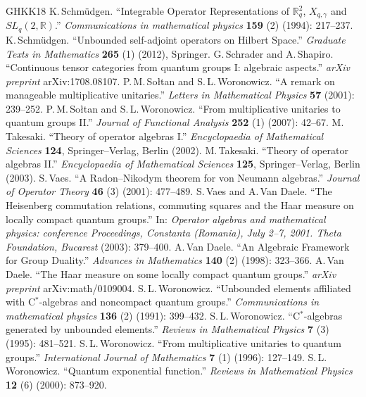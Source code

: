\documentclass[11pt, reqno]{amsart}
\theoremstyle{definition}
\numberwithin{equation}{section}
\def\R{\mathbb R}
\begin{document}
\begin{thebibliography}{GHKK18}
 K.\,Schm\"{u}dgen. ``Integrable Operator Representations of $\R_q^2$, $X_{q,\gamma}$ and $SL_q(2,\R)$.'' \emph{Communications in mathematical physics} \textbf{159} (2) (1994): 217--237.
 K.\,Schm\"{u}dgen. ``Unbounded self-adjoint operators on Hilbert Space.'' \emph{Graduate Texts in Mathematics} \textbf{265} (1) (2012), Springer.
 G.\,Schrader and A.\,Shapiro. ``Continuous tensor categories from quantum groups I: algebraic aspects.'' \emph{arXiv preprint} arXiv:1708.08107.
 P.\,M.\,So\l tan and S.\,L.\,Woronowicz. ``A remark on manageable multiplicative unitaries.'' \emph{Letters in Mathematical Physics} \textbf{57} (2001): 239--252.
 P.\,M.\,So\l tan and S.\,L.\,Woronowicz. ``From multiplicative unitaries to quantum groups II.'' \emph{Journal of Functional Analysis} \textbf{252} (1) (2007): 42--67.
 M.\,Takesaki. ``Theory of operator algebras I.'' \emph{Encyclopaedia of Mathematical Sciences} \textbf{124}, Springer--Verlag, Berlin (2002). 
 M.\,Takesaki. ``Theory of operator algebras II.'' \emph{Encyclopaedia of Mathematical Sciences} \textbf{125}, Springer--Verlag, Berlin (2003).
 S.\,Vaes. ``A Radon--Nikodym theorem for von Neumann algebras.'' \emph{Journal of Operator Theory} \textbf{46} (3) (2001): 477--489.
 S.\,Vaes and A.\,Van Daele. ``The Heisenberg commutation relations, commuting squares and the Haar measure on locally compact quantum groups.'' In: \emph{Operator algebras and mathematical physics: conference Proceedings, Constanta (Romania), July 2–7, 2001. Theta Foundation, Bucarest} (2003): 379--400.
 A.\,Van Daele. ``An Algebraic Framework for Group Duality.'' \emph{Advances in Mathematics} \textbf{140} (2) (1998): 323--366.
 A.\,Van Daele. ``The Haar measure on some locally compact quantum groups.'' \emph{arXiv preprint} arXiv:math/0109004.
 S.\,L.\,Woronowicz. ``Unbounded elements affiliated with C$^*$-algebras and noncompact quantum groups.'' \emph{Communications in mathematical physics} \textbf{136} (2) (1991): 399--432.
 S.\,L.\,Woronowicz. ``C$^*$-algebras generated by unbounded elements.'' \emph{Reviews in Mathematical Physics} \textbf{7} (3) (1995): 481--521.
 S.\,L.\,Woronowicz. ``From multiplicative unitaries to quantum groups.'' \emph{International Journal of Mathematics} \textbf{7} (1) (1996): 127--149. 
 S.\,L.\,Woronowicz. ``Quantum exponential function.'' \emph{Reviews in Mathematical Physics} \textbf{12} (6) (2000): 873--920.

\end{thebibliography}
\end{document}
